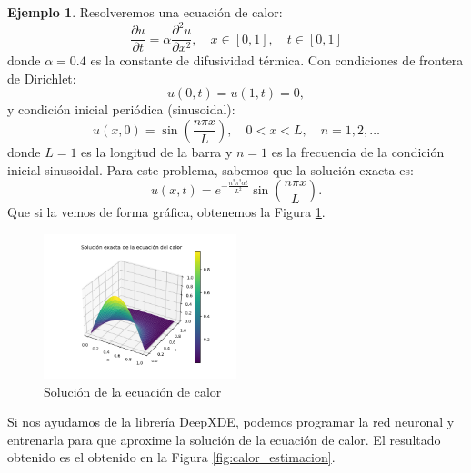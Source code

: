 \documentclass[a4paper,11pt,spanish, twoside, leqno]{tfg-uam}
\theoremstyle{definition}
\newtheorem{exmp}[teor]{Ejemplo}
\begin{document}
\begin{mdframed}
    \begin{exmp}
        
        Resolveremos una ecuación de calor:
        \begin{equation*}
        \frac{\partial u}{\partial t} = \alpha \frac{\partial^2 u}{\partial x^2}, \quad x \in [0, 1], \quad t \in [0, 1]
        \end{equation*}
        donde \(\alpha = 0.4\) es la constante de difusividad térmica. Con condiciones de frontera de Dirichlet:
        \begin{equation*}
        u(0, t) = u(1, t) = 0,
        \end{equation*}
        y condición inicial periódica (sinusoidal):
        \begin{equation*}
        u(x, 0) = \sin\left(\frac{n \pi x}{L}\right), \quad 0 < x < L, \quad n = 1, 2, \ldots
        \end{equation*}
        donde \(L = 1\) es la longitud de la barra y \(n = 1\) es la frecuencia de la condición inicial sinusoidal.
        Para este problema, sabemos que la solución exacta es:
        \begin{equation*}
        u(x, t) = e^{-\frac{n^2 \pi^2 \alpha t}{L^2}} \sin\left(\frac{n \pi x}{L}\right).
        \end{equation*}
        Que si la vemos de forma gráfica, obtenemos la Figura \ref{fig:calor_exacta}.
        \begin{figure}[H] 
            \centering
            \includegraphics[width=0.5\textwidth]{Figuras/calor_exacta.png}
            \caption{Solución de la ecuación de calor}
            \label{fig:calor_exacta}
        \end{figure}
        Si nos ayudamos de la librería DeepXDE, podemos programar la red neuronal y entrenarla para que aproxime la solución de la ecuación de calor. El resultado obtenido es el obtenido en la Figura \ref{fig:calor_estimacion}.
        \begin{figure}[H] 

\end{figure}
\end{exmp}
\end{mdframed}
\end{document}
